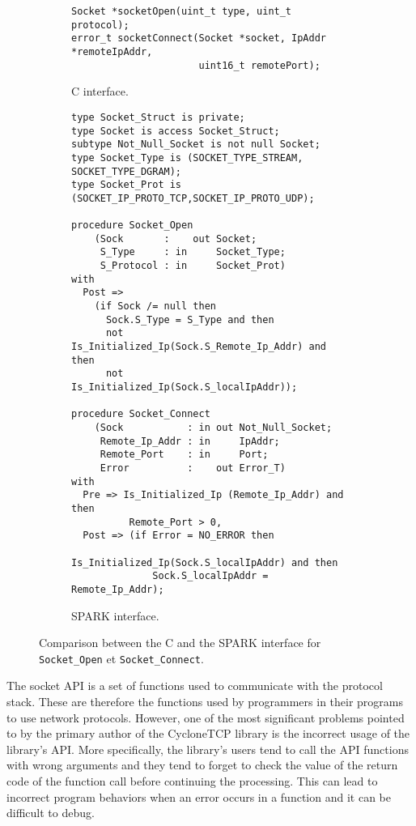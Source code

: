 \documentclass[runningheads]{llncs}
\begin{document}
\begin{figure}[t]
\begin{subfigure}{\textwidth}
\begin{lstlisting}[style=C, frame=bottomline]
Socket *socketOpen(uint_t type, uint_t protocol);
error_t socketConnect(Socket *socket, IpAddr *remoteIpAddr,
                      uint16_t remotePort);
\end{lstlisting}
\caption{C interface.}
\label{Fig:socketInterface:C}
\end{subfigure}
\begin{subfigure}{\textwidth}
\begin{lstlisting}[style=Spark, frame=bottomline]
type Socket_Struct is private;
type Socket is access Socket_Struct;
subtype Not_Null_Socket is not null Socket;
type Socket_Type is (SOCKET_TYPE_STREAM, SOCKET_TYPE_DGRAM);
type Socket_Prot is (SOCKET_IP_PROTO_TCP,SOCKET_IP_PROTO_UDP);

procedure Socket_Open
    (Sock       :    out Socket;
     S_Type     : in     Socket_Type;
     S_Protocol : in     Socket_Prot)
with
  Post =>
    (if Sock /= null then
      Sock.S_Type = S_Type and then
      not Is_Initialized_Ip(Sock.S_Remote_Ip_Addr) and then
      not Is_Initialized_Ip(Sock.S_localIpAddr));

procedure Socket_Connect
    (Sock           : in out Not_Null_Socket;
     Remote_Ip_Addr : in     IpAddr;
     Remote_Port    : in     Port;
     Error          :    out Error_T)
with
  Pre => Is_Initialized_Ip (Remote_Ip_Addr) and then
          Remote_Port > 0,
  Post => (if Error = NO_ERROR then
              Is_Initialized_Ip(Sock.S_localIpAddr) and then
              Sock.S_localIpAddr = Remote_Ip_Addr);
\end{lstlisting}
\caption{SPARK interface.}
\label{Fig:socketInterface:SPARK}
\end{subfigure}
\caption{Comparison between the C and the SPARK interface for \texttt{Socket\_Open} et \texttt{Socket\_Connect}.}
\label{Fig:socketInterface}
\end{figure}

    The socket API is a set of functions used to communicate with the protocol stack. These are therefore the functions used
    by programmers in their programs to use network protocols. However, one of the most significant problems pointed to by the
    primary author of the CycloneTCP library is the incorrect usage of the library's API. More specifically, the library's users
    tend to call the API functions with wrong arguments and they tend to forget to check the value of the return code of the
    function call before continuing the processing. This can lead to incorrect program behaviors when an error occurs in a function
    and it can be difficult to debug.
\end{document}
